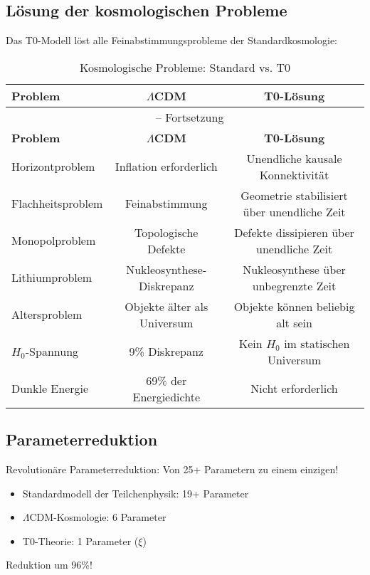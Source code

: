 \documentclass[12pt,a4paper]{article}
\begin{document}
	\subsection{Lösung der kosmologischen Probleme}
	
	Das T0-Modell löst alle Feinabstimmungsprobleme der Standardkosmologie:
	
	\begin{longtable}{lcc}
		\caption{Kosmologische Probleme: Standard vs. T0} \\
		\toprule
		\textbf{Problem} & \textbf{$\Lambda$CDM} & \textbf{T0-Lösung} \\
		\midrule
		\endfirsthead
		\multicolumn{3}{c}{\tablename\ \thetable{} -- Fortsetzung} \\
		\toprule
		\textbf{Problem} & \textbf{$\Lambda$CDM} & \textbf{T0-Lösung} \\
		\midrule
		\endhead
		Horizontproblem & Inflation erforderlich & Unendliche kausale Konnektivität \\
		Flachheitsproblem & Feinabstimmung & Geometrie stabilisiert über unendliche Zeit \\
		Monopolproblem & Topologische Defekte & Defekte dissipieren über unendliche Zeit \\
		Lithiumproblem & Nukleosynthese-Diskrepanz & Nukleosynthese über unbegrenzte Zeit \\
		Altersproblem & Objekte älter als Universum & Objekte können beliebig alt sein \\
		$H_0$-Spannung & 9\% Diskrepanz & Kein $H_0$ im statischen Universum \\
		Dunkle Energie & 69\% der Energiedichte & Nicht erforderlich \\
		\bottomrule
	\end{longtable}
	
	\subsection{Parameterreduktion}
	
	\begin{revolutionary}
		Revolutionäre Parameterreduktion: Von 25+ Parametern zu einem einzigen!
		\begin{itemize}
			\item Standardmodell der Teilchenphysik: 19+ Parameter
			\item $\Lambda$CDM-Kosmologie: 6 Parameter
			\item T0-Theorie: 1 Parameter ($\xi$)
		\end{itemize}
		Reduktion um 96\%!
	\end{revolutionary}
	
\end{document}
